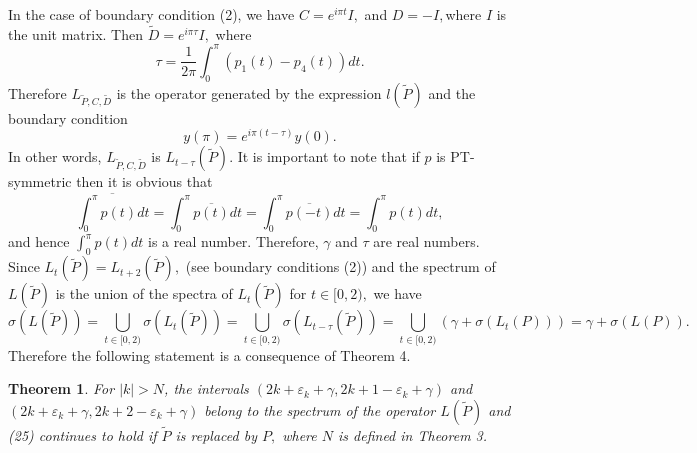 \documentclass{article}%
\newtheorem{theorem}{Theorem}
{}
\begin{document}
In the case of boundary condition (2), we have $C=e^{i\pi t}I,$ and
$D=-I,$where $I$ is the unit matrix. Then $\widetilde{D}=e^{i\pi\tau}I,$
where
\begin{equation}
\tau=\frac{1}{2\pi}\int_{0}^{\pi}\left(  p_{1}(t)-p_{4}(t)\right)  dt.
\tag{26}%
\end{equation}
Therefore $L_{\widetilde{P},C,\widetilde{D}}$ is the operator generated by the
expression $l\left(  \widetilde{P}\right)  $ and the boundary condition
\begin{equation}
y(\pi)=e^{i\pi(t-\tau)}y(0). \tag{27}%
\end{equation}
In other words, $L_{\widetilde{P},C,\widetilde{D}}$ is $L_{t-\tau}\left(
\widetilde{P}\right)  .$ It is important to note that if $p$ is PT-symmetric
then it is obvious that
\begin{equation}
\overline{\int_{0}^{\pi}p(t)dt}=\int_{0}^{\pi}\overline{p(t)}dt=\int_{0}^{\pi
}\overline{p(-t)}dt=\int_{0}^{\pi}p(t)dt, \tag{28}%
\end{equation}
and hence $\int_{0}^{\pi}p(t)dt$ is a real number. Therefore, $\gamma$ and
$\tau$ are real numbers. Since $L_{t}\left(  \widetilde{P}\right)
=L_{t+2}\left(  \widetilde{P}\right)  ,$ (see boundary conditions (2)) and the
spectrum of $L\left(  \widetilde{P}\right)  $ is the union of the spectra of
$L_{t}\left(  \widetilde{P}\right)  $ for $t\in\lbrack0,2),$ we have
\[
\sigma\left(  L\left(  \widetilde{P}\right)  \right)  =%
{\textstyle\bigcup\limits_{t\in\lbrack0,2)}}
\sigma\left(  L_{t}\left(  \widetilde{P}\right)  \right)  =%
{\textstyle\bigcup\limits_{t\in\lbrack0,2)}}
\sigma\left(  L_{t-\tau}\left(  \widetilde{P}\right)  \right)  =%
{\textstyle\bigcup\limits_{t\in\lbrack0,2)}}
\left(  \gamma+\sigma\left(  L_{t}\left(  P\right)  \right)  \right)
=\gamma+\sigma\left(  L\left(  P\right)  \right)  .
\]
Therefore the following statement is a consequence of Theorem 4.

\begin{theorem}
For $\left\vert k\right\vert >N$, the intervals $(2k+\varepsilon_{k}%
+\gamma,2k+1-\varepsilon_{k}+\gamma)$ and $(2k+\varepsilon_{k}+\gamma
,2k+2-\varepsilon_{k}+\gamma)$ belong to the spectrum of the operator
$L\left(  \widetilde{P}\right)  $ and (25) continues to hold if $\widetilde
{P}$ is replaced by $P,$ where $N$ is defined in Theorem 3.
\end{theorem}
\end{document}
